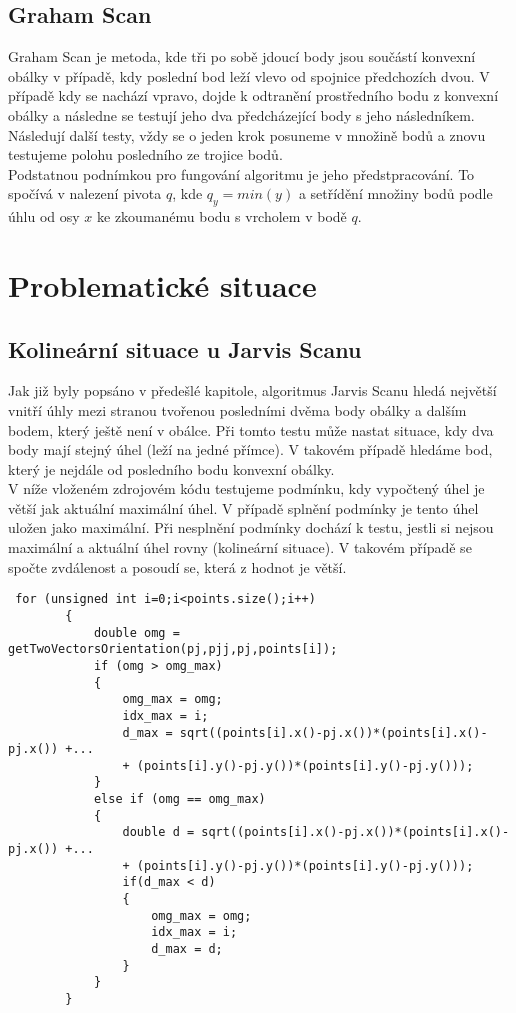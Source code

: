 \documentclass{article}
\begin{document}
\subsection{Graham Scan}
Graham Scan je metoda, kde tři po sobě jdoucí body jsou součástí konvexní obálky v případě, kdy poslední bod leží vlevo od spojnice předchozích dvou. V případě kdy se nachází vpravo, dojde k odtranění prostředního bodu z konvexní obálky a následne se testují jeho dva předcházející body s jeho následníkem. Následují další testy, vždy se o jeden krok posuneme v množině bodů a znovu testujeme polohu posledního ze trojice bodů.\\

Podstatnou podnímkou pro fungování algoritmu je jeho předstpracování. To spočívá v nalezení pivota $q$, kde $q_y=min(y)$ a setřídění množiny bodů podle úhlu od osy $x$ ke zkoumanému bodu s vrcholem v bodě $q$.

\newpage
\section{Problematické situace}
\subsection{Kolineární situace u Jarvis Scanu}
Jak již byly popsáno v předešlé kapitole, algoritmus Jarvis Scanu hledá největší vnitří úhly mezi stranou tvořenou posledními dvěma body obálky a dalším bodem, který ještě není v obálce. Při tomto testu může nastat situace, kdy dva body mají stejný úhel (leží na jedné přímce). V takovém případě hledáme bod, který je nejdále od posledního bodu konvexní obálky.\\

V níže vloženém zdrojovém kódu testujeme podmínku, kdy vypočtený úhel je větší jak aktuální maximální úhel. V případě splnění podmínky je tento úhel uložen jako maximální. Při nesplnění podmínky dochází k testu, jestli si nejsou maximální a aktuální úhel rovny (kolineární situace). V takovém případě se spočte zvdálenost a posoudí se, která z hodnot je větší.\\
 
\begin{lstlisting}
 for (unsigned int i=0;i<points.size();i++)
        {
            double omg = getTwoVectorsOrientation(pj,pjj,pj,points[i]);
            if (omg > omg_max)
            {
                omg_max = omg;
                idx_max = i;
                d_max = sqrt((points[i].x()-pj.x())*(points[i].x()-pj.x()) +...
                + (points[i].y()-pj.y())*(points[i].y()-pj.y()));
            }
            else if (omg == omg_max)
            {
                double d = sqrt((points[i].x()-pj.x())*(points[i].x()-pj.x()) +...
                + (points[i].y()-pj.y())*(points[i].y()-pj.y()));
                if(d_max < d)
                {
                    omg_max = omg;
                    idx_max = i;
                    d_max = d;
                }
            }
        }
\end{lstlisting}
\end{document}
